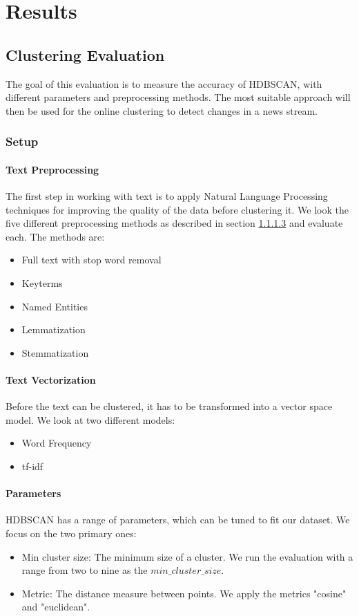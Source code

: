 \section{Results}

\subsection{Clustering Evaluation}

The goal of this evaluation is to measure the accuracy of HDBSCAN, with different parameters and preprocessing methods. The most suitable approach will then be used for the online clustering to detect changes in a news stream.

\subsubsection{Setup}

\paragraph{Text Preprocessing}

 The first step in working with text is to apply Natural Language Processing techniques for improving the quality of the data before clustering it. We look the five different preprocessing methods  as described in section \ref{} and evaluate each. The methods are:
 \begin{itemize}
     \item Full text with stop word removal
     \item Keyterms
     \item Named Entities
     \item Lemmatization
     \item Stemmatization
 \end{itemize} 

\paragraph{Text Vectorization} Before the text can be clustered, it has to be transformed into a vector space model. We look at two different models:
\begin{itemize}
    \item Word Frequency
    \item tf-idf
\end{itemize}

\paragraph{Parameters} HDBSCAN has a range of parameters, which can be tuned to fit our dataset. We focus on the two primary ones:
\begin{itemize}
    \item Min cluster size: The minimum size of a cluster. We run the evaluation with a range from two to nine as the $min\_cluster\_size$. 
    \item Metric: The distance measure between points. We apply the metrics "cosine" and "euclidean". 
    
\end{itemize}

